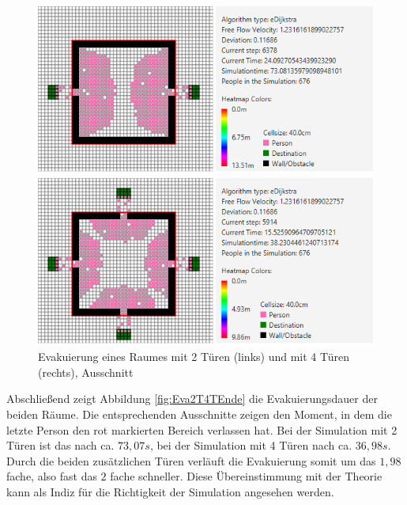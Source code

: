 \begin{figure}[!htb]
	\centering
	\begin{minipage}{.5\textwidth}
		\centering
		\includegraphics[width=\textwidth]{abbildungen/Evak2TuerenMitte.PNG}
	\end{minipage}%
	\begin{minipage}{0.5\textwidth}
		\centering
		\includegraphics[width=\textwidth]{abbildungen/Evak4TuerenMitte.PNG}
	\end{minipage}
	\caption{Evakuierung eines Raumes mit 2 Türen (links) und mit 4 Türen (rechts), Ausschnitt}
	\label{fig:Eva2T4TMitte}
\end{figure}

Abschließend zeigt Abbildung \ref{fig:Eva2T4TEnde} die Evakuierungsdauer der beiden Räume. Die entsprechenden Ausschnitte zeigen den Moment, in dem die letzte Person den rot markierten Bereich verlassen hat. Bei der Simulation mit 2 Türen ist das nach ca. $73,07s$, bei der Simulation mit 4 Türen nach ca. $36,98s$. Durch die beiden zusätzlichen Türen verläuft die Evakuierung somit um das $1,98$ fache, also fast das $2$ fache schneller. Diese Übereinstimmung mit der Theorie kann als Indiz für die Richtigkeit der Simulation angesehen werden. \\

